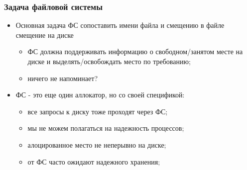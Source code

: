 \begin{frame}
\frametitle{Задача файловой системы}
\begin{itemize}
  \item<1-> Основная задача ФС сопоставить имени файла и смещению в файле смещение на диске
    \begin{itemize}
      \item ФС должна поддерживать информацию о свободном/занятом месте на диске и выделять/освобождать место по требованию;
      \item ничего не напоминает?
    \end{itemize}
  \item<2-> ФС - это еще один аллокатор, но со своей спецификой:
    \begin{itemize}
      \item все запросы к диску тоже проходят через ФС;
      \item мы не можем полагаться на надежность процессов;
      \item алоцированное место не неперывно на диске;
      \item от ФС часто ожидают надежного хранения;
    \end{itemize}
\end{itemize}
\end{frame}

